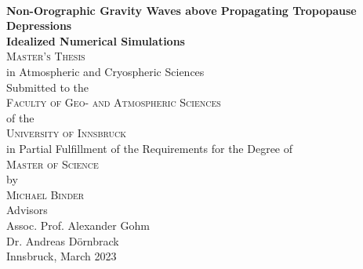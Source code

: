 \begin{titlepage}
\begin{center}

~\\[15mm]
{\Huge  {\bf Non-Orographic Gravity Waves above Propagating Tropopause Depressions}}\\[5mm]


{\LARGE {\bf Idealized Numerical Simulations}}\\[\spaceTitlepage]


{\Large \textsc{Master's Thesis}} \\[\spaceTitlepage]


{\large in Atmospheric and Cryospheric Sciences} \\[\spaceTitlepage]


{\large Submitted to the} \\[2mm]
{\Large \textsc{Faculty of Geo- and Atmospheric Sciences}} \\[2mm]
{\large of the} \\[2mm]
{\Large \textsc{University of Innsbruck}} \\[\spaceTitlepage]


{\large in Partial Fulfillment of the Requirements for the Degree of} \\[2mm]
{\Large \textsc{Master of Science}} \\[\spaceTitlepage]


{\large by} \\[2mm]
{\Large \textsc{Michael Binder}} \\[\spaceTitlepage]


{\large Advisors} \\[2mm]
{\large Assoc. Prof. Alexander Gohm} \\[2mm]
{\large Dr. Andreas Dörnbrack} \\[\spaceTitlepage]

{\large Innsbruck, March 2023}

\end{center}
\end{titlepage}
